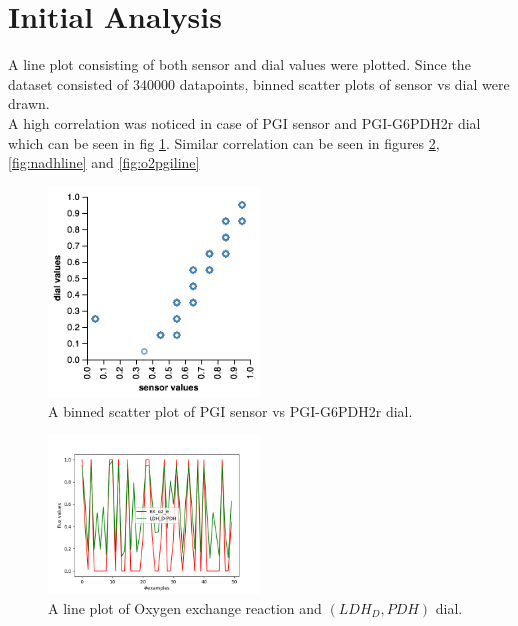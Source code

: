 \documentclass[12pt,chapterheads]{ucsd}
\begin{document}
\section{Initial Analysis} \label{sec:initial Analysis}
A line plot consisting of both sensor and dial values were plotted. Since the dataset consisted of $340000$ datapoints, binned scatter plots of sensor vs dial were drawn. \\
A high correlation was noticed in case of PGI sensor and PGI-G6PDH2r dial which can be seen in fig \ref{fig:binned}. Similar correlation can be seen in figures \ref{fig:o2ldhline}, \ref{fig:nadhline} and \ref{fig:o2pgiline}

\begin{figure}[h] 
\centering
\includegraphics[width=0.5\textwidth]{PGI_sensor_PGI_G6PDH2r}
\caption[Binned scatter plot of PGI sensor vs PGI-G6PDH2r dial]
{A binned scatter plot of PGI sensor vs PGI-G6PDH2r dial.}
\label{fig:binned}
\end{figure}

\begin{figure}[h] 
\centering
\includegraphics[width=0.5\textwidth]{EX_o2_e_LDH_D_PDH_lineplot_50}
\caption[EX\textunderscore o2 \textunderscore c with LDH \textunderscore D - PDH line plot]
{A line plot of Oxygen exchange reaction and $(LDH_D, PDH)$  dial.}
\label{fig:o2ldhline}
\end{figure}
\end{document}
